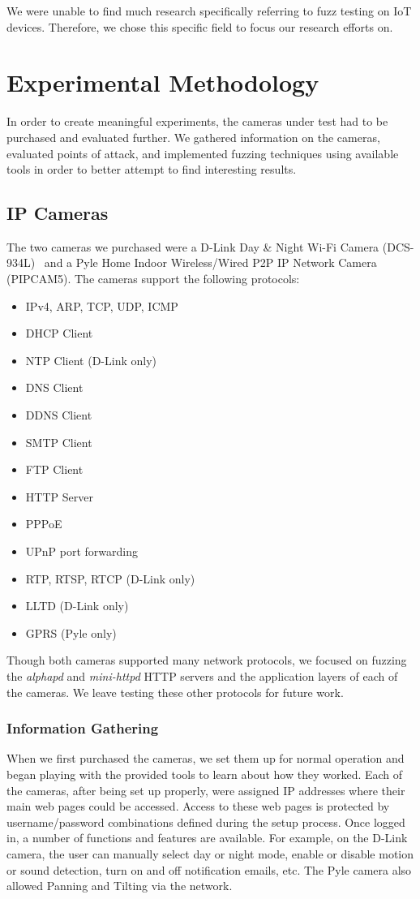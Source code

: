 \documentclass[letterpaper,twocolumn,10pt]{article}
\begin{document}
We were unable to find much research specifically referring to fuzz testing on IoT devices. Therefore, we chose this specific field to focus our research efforts on.

\section{Experimental Methodology}
In order to create meaningful experiments, the cameras under test had to be purchased and evaluated further. We gathered information on the cameras, evaluated points of attack, and implemented fuzzing techniques using available tools in order to better attempt to find interesting results.   

\subsection{IP Cameras}
The two cameras we purchased were a D-Link Day \& Night Wi-Fi Camera (DCS-934L)~\cite{dlinkCam} and a Pyle Home Indoor Wireless/Wired P2P IP Network Camera (PIPCAM5). The cameras support the following protocols:
\begin{itemize}
	\itemsep-.5em
	\item IPv4, ARP, TCP, UDP, ICMP
	\item DHCP Client
	\item NTP Client (D-Link only)
	\item DNS Client
	\item DDNS Client
	\item SMTP Client
	\item FTP Client
	\item HTTP Server
	\item PPPoE
	\item UPnP port forwarding
	\item RTP, RTSP, RTCP (D-Link only)
	\item LLTD (D-Link only)
	\item GPRS (Pyle only)
\end{itemize}
Though both cameras supported many network protocols, we focused on fuzzing the \textit{alphapd} and \textit{mini-httpd} HTTP servers and the application layers of each of the cameras. We leave testing these other protocols for future work. 


\subsubsection{Information Gathering}
When we first purchased the cameras, we set them up for normal operation and began playing with the provided tools to learn about how they worked. Each of the cameras, after being set up properly, were assigned IP addresses where their main web pages could be accessed. Access to these web pages is protected by username/password combinations defined during the setup process. Once logged in, a number of functions and features are available. For example, on the D-Link camera, the user can manually select day or night mode, enable or disable motion or sound detection, turn on and off notification emails, etc. The Pyle camera also allowed Panning and Tilting via the network.
\end{document}
